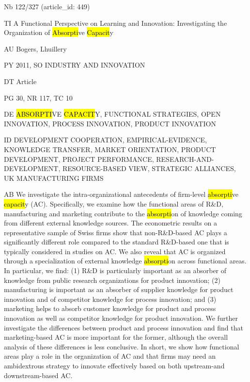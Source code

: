 \documentclass[a4paper]{article}
\begin{document}
\vspace*{-2cm}
Nb \tabto{0cm}122/327 (article\_id: 449)\par
TI \tabto{0cm}A Functional Perspective on Learning and Innovation: Investigating the Organization of \hl{Absorpti}ve \hl{Capacit}y\par
AU \tabto{0cm}Bogers, Lhuillery\par
PY \tabto{0cm}2011, SO INDUSTRY AND INNOVATION\par
DT \tabto{0cm}Article\par
PG \tabto{0cm}30, NR 117, TC 10\par
DE \tabto{0cm}\hl{ABSORPTI}VE \hl{CAPACIT}Y, FUNCTIONAL STRATEGIES, OPEN INNOVATION, PROCESS INNOVATION, PRODUCT INNOVATION\par
ID \tabto{0cm}DEVELOPMENT COOPERATION, EMPIRICAL-EVIDENCE, KNOWLEDGE TRANSFER, MARKET ORIENTATION, PRODUCT DEVELOPMENT, PROJECT PERFORMANCE, RESEARCH-AND-DEVELOPMENT, RESOURCE-BASED VIEW, STRATEGIC ALLIANCES, UK MANUFACTURING FIRMS\par
AB \tabto{0cm}We investigate the intra-organizational antecedents of firm-level \hl{absorpti}ve \hl{capacit}y (AC). Specifically, we examine how the functional areas of R\&D, manufacturing and marketing contribute to the \hl{absorpti}on of knowledge coming from different external knowledge sources. The econometric results on a representative sample of Swiss firms show that non-R\&D-based AC plays a significantly different role compared to the standard R\&D-based one that is typically considered in studies on AC. We also reveal that AC is organized through a specialization of external knowledge \hl{absorpti}on across functional areas. In particular, we find: (1) R\&D is particularly important as an absorber of knowledge from public research organizations for product innovation; (2) manufacturing is important as an absorber of supplier knowledge for product innovation and of competitor knowledge for process innovation; and (3) marketing helps to absorb customer knowledge for product and process innovation as well as competitor knowledge for product innovation. We further investigate the differences between product and process innovation and find that marketing-based AC is more important for the former, although the overall analysis of these differences is less conclusive. In short, we show how functional areas play a role in the organization of AC and that firms may need an ambidextrous strategy to innovate effectively based on both upstream-and downstream-based AC.\par
\clearpage
\end{document}
